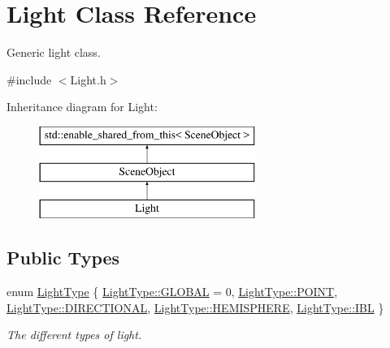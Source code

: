 \hypertarget{class_light}{}\section{Light Class Reference}
\label{class_light}


Generic light class.




{\ttfamily \#include $<$Light.\+h$>$}

Inheritance diagram for Light\+:\begin{figure}[H]
\begin{center}
\leavevmode
\includegraphics[height=3.000000cm]{class_light}
\end{center}
\end{figure}
\subsection*{Public Types}
\begin{DoxyCompactItemize}
\item 
enum \hyperlink{class_light_a661d9480e01af8b1612860b9630ef5f8}{Light\+Type} \{ \newline
\hyperlink{class_light_a661d9480e01af8b1612860b9630ef5f8a6eecfba72d12922ee1dead07a0ef3334}{Light\+Type\+::\+G\+L\+O\+B\+AL} = 0,
\hyperlink{class_light_a661d9480e01af8b1612860b9630ef5f8aaebdbcb765394d25d6a604589a890f82}{Light\+Type\+::\+P\+O\+I\+NT},
\hyperlink{class_light_a661d9480e01af8b1612860b9630ef5f8ab6f2249394a4def60a78b342dcc925b9}{Light\+Type\+::\+D\+I\+R\+E\+C\+T\+I\+O\+N\+AL},
\hyperlink{class_light_a661d9480e01af8b1612860b9630ef5f8a745727a64f32080cf213b668026dde48}{Light\+Type\+::\+H\+E\+M\+I\+S\+P\+H\+E\+RE},
\newline
\hyperlink{class_light_a661d9480e01af8b1612860b9630ef5f8a239e71da0606abd283f2bccf1965badd}{Light\+Type\+::\+I\+BL}
 \}\begin{DoxyCompactList}\small\item\em The different types of light. \end{DoxyCompactList}
\end{DoxyCompactItemize}
